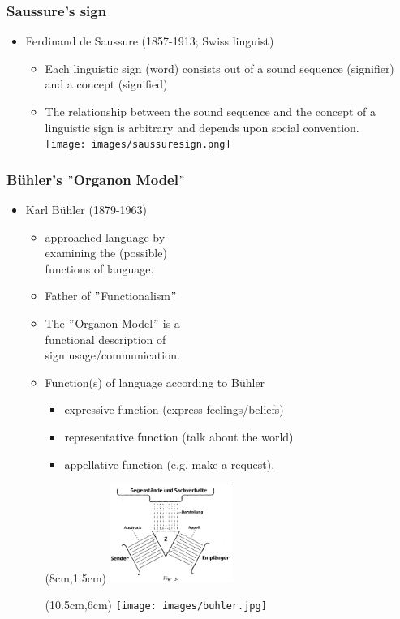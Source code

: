 \documentclass[12pt, table]{beamer}
\begin{document}
\begin{frame}
\frametitle{Saussure's sign}
\begin{itemize} 
\item Ferdinand de Saussure (1857-1913; Swiss linguist)
\begin{itemize}
\item Each linguistic sign (word) consists out of a sound sequence (signifier) and a concept (signified)
\item The relationship between the sound sequence and the concept of a linguistic sign is arbitrary and depends upon social convention.\\
\texttt{[image: images/saussuresign.png]}
\end{itemize}
\end{itemize}
\end{frame}

\begin{frame}
\frametitle{B{\"u}hler's $"$Organon Model$"$}
\begin{itemize} 
\item Karl B{\"u}hler (1879-1963) 
\begin{itemize}
\item approached language by \\ examining the (possible) \\ functions of language.
\item Father of $"$Functionalism$"$
\item The $"$Organon Model$"$ is a \\ functional description of \\ sign usage/communication.
\item Function(s) of language according to B{\"u}hler
\begin{itemize}
\item expressive function (express feelings/beliefs)
\item representative function (talk about the world)  
\item appellative function (e.g. make a request).
\end{itemize}
\begin{textblock*}{8cm}(8cm,1.5cm)
\includegraphics[width=4cm]{images/organon.png}
\end{textblock*}
\begin{textblock*}{8cm}(10.5cm,6cm)
\texttt{[image: images/buhler.jpg]}
\end{textblock*}
\end{itemize}
\end{itemize}
\end{frame}
\end{document}
